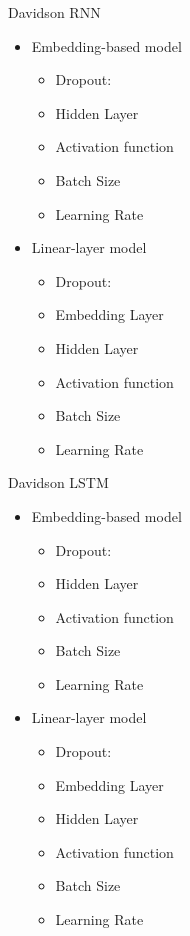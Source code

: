 Davidson RNN
\begin{itemize}
  \item Embedding-based model
    \begin{itemize}
      \item Dropout:
      \item Hidden Layer
      \item Activation function
      \item Batch Size
      \item Learning Rate
    \end{itemize}
  \item Linear-layer model
    \begin{itemize}
      \item Dropout:
      \item Embedding Layer
      \item Hidden Layer
      \item Activation function
      \item Batch Size
      \item Learning Rate
    \end{itemize}
\end{itemize}

Davidson LSTM
\begin{itemize}
  \item Embedding-based model
    \begin{itemize}
      \item Dropout:
      \item Hidden Layer
      \item Activation function
      \item Batch Size
      \item Learning Rate
    \end{itemize}
  \item Linear-layer model
    \begin{itemize}
      \item Dropout:
      \item Embedding Layer
      \item Hidden Layer
      \item Activation function
      \item Batch Size
      \item Learning Rate
    \end{itemize}
\end{itemize}

